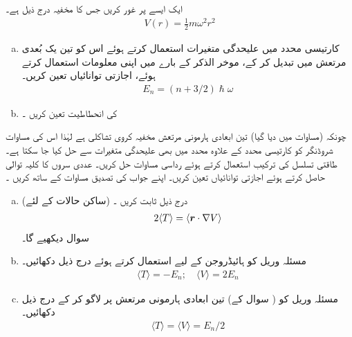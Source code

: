 ایک ایسے   پر غور کریں جس کا مخفیہ  درج ذیل ہے۔ 
\begin{align}\label{مساوات_تین_ابعادی_ہارمونی_مخفیہ}
V(r) = \frac{1}{2} m \omega^2 r^2
\end{align}
\begin{enumerate}[a.]
\item
کارتیسی محدد میں علیحدگی متغیرات استعمال کرتے ہوئے اس کو تین  یک بُعدی مرتعش میں تبدیل کر کے، موخر الذکر کے بارے میں اپنی معلومات استعمال کرتے ہوئے،  اجازتی توانائیاں تعین کریں۔  
\begin{align}\label{مساوات_تین_ابعادی_ہارمونی_اجازتی}
E_n = (n + 3/2) \hslash \omega
\end{align}
\item
{} کی   انحطاطیت   تعین کریں ۔
\end{enumerate}
چونکہ  (مساوات  میں دیا گیا)  تین ابعادی  ہارمونی مرتعش مخفیہ  کروی تشاکلی ہے لہٰذا اس کی مساوات شروڈنگر کو کارتیسی محدد کے علاوہ    محدد میں بھی علیحدگی  متغیرات سے حل کیا جا سکتا ہے۔ طاقتی تسلسل کی ترکیب استعمال کرتے ہوئے رداسی مساوات حل کریں۔ عددی سروں کا کلیہ توالی حاصل کرتے ہوئے اجازتی توانائیاں تعین کریں۔ اپنے جواب کی تصدیق مساوات  کے ساتھ کریں ۔
\begin{enumerate}[a.]
\item
(ساکن حالات کے لئے)  درج ذیل   ثابت کریں ۔
\begin{align}
2 \langle T \rangle = \langle {\ensuremath{{\boldsymbol{r}}}} \cdot \nabla V \rangle
\end{align}
  سوال  دیکھیے گا۔ 
\item
مسئلہ وریل کو ہائیڈروجن کے لیے استعمال کرتے ہوئے درج ذیل دکھائیں۔ 
\begin{align}\label{مساوات_تین_ابعادی_مسئلہ_وریل}
\langle T \rangle = - E_n; \quad \langle V \rangle = 2 E_n
\end{align}
\item
مسئلہ وریل کو ( سوال  کے)  تین ابعادی ہارمونی مرتعش پر لاگو کر کے درج ذیل دکھائیں۔ 
\begin{align}
\langle T \rangle = \langle V \rangle = E_n /2
\end{align}
\end{enumerate}
